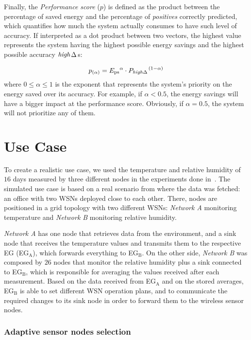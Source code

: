 \documentclass{llncs}
\newcommand{\EG}[1]{EG$_{\text{#1}}$}
\newcommand{\ourDelta}[2][]{\ensuremath{\Delta\textsuperscript{\text{#1}}
\textsubscript{\text{#2}}}}
\newcommand{\high}[1][ ]{\ensuremath{\text{\emph{high}}#1}}
\newcommand{\highDelta}[2][]{\high{\ourDelta[#1]{#2}}}
\begin{document}
Finally, the \emph{Performance score} ($p$) is defined as the product 
between the percentage of saved energy and the percentage of \emph{positives} 
correctly predicted, which quantifies how much the system actually 
consumes to have such level of accuracy. If interpreted as a dot product 
between two vectors, the highest value represents the system having the highest 
possible energy savings and the highest possible accuracy \highDelta{}s:

\begin{equation}
p_{(\alpha)} =  {{E_\text{ps}}^\alpha } \cdot { 
{P_\text{\highDelta{}}}^{(1 - \alpha)} }
\label{eq:performance}
\end{equation}
where $0 \leq \alpha \leq 1$ is the exponent that represents the system's 
priority on the energy saved over its accuracy. For example, if $\alpha < 0.5$, 
the energy savings will have a bigger impact at the performance score. 
Obviously, if $\alpha = 0.5$, the system will not prioritize any of them. 

\section{Use Case}
\label{sec:current-simulations-scenario}

To create a realistic use case, we used the temperature and relative humidity 
of $16$ days measured by three different nodes in the experiments done 
in~\cite{Yann-Ael2005}. 
The simulated use case is based on a real scenario from where the data was 
fetched: an office with two WSNs deployed close to each other. 
There, nodes are positioned in a grid topology with two different WSNs: 
\emph{Network A} monitoring temperature and \emph{Network B} monitoring 
relative humidity.

\emph{Network A} has one node that retrieves data from the environment, and a 
sink node that receives the temperature values and transmits them to the 
respective EG (\EG{A}), which forwards everything to \EG{B}. On the other side, 
\emph{Network B} was composed by $26$ nodes that monitor the relative humidity 
plus a sink connected to \EG{B}, which is responsible for averaging the values 
received after each measurement. Based on the data received from \EG{A} and on 
the stored averages, \EG{B} is able to set different WSN operation plans, and to 
communicate the required changes to its sink node in order to forward them to 
the wireless sensor nodes.

\subsubsection{Adaptive sensor nodes selection}
\end{document}
